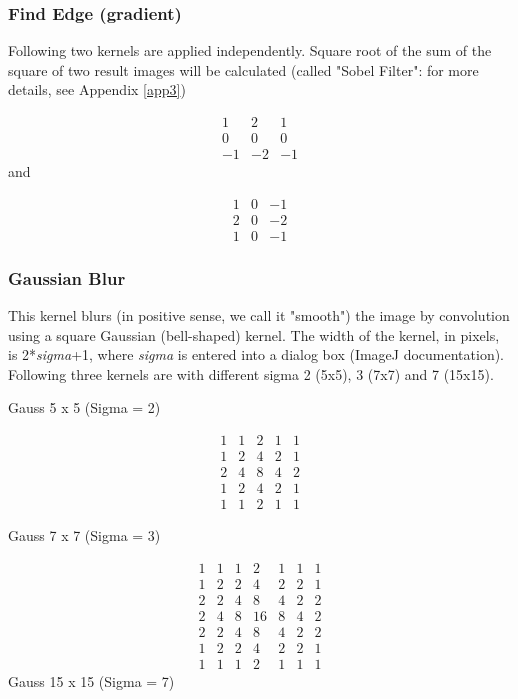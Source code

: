 \subsubsection{Find Edge (gradient)}
\label{subsub:findedgekernel}
Following two kernels are applied independently. Square root of the sum
of the square of two result images will be calculated (called
"Sobel Filter": for more details,
see Appendix \ref{app3}) \ 

\[
 \begin{matrix}
  1 & 2 & 1 \\
  0 & 0 & 0 \\
  -1 & -2 & -1
 \end{matrix}
\]
and

\[
 \begin{matrix}
  1 & 0 & -1 \\
  2 & 0 & -2 \\
  1 & 0 & -1
 \end{matrix}
\]


\subsubsection{Gaussian Blur}

This kernel blurs (in positive sense, we call it
"smooth") the image by convolution
using a square Gaussian (bell-shaped) kernel. The width of the kernel,
in pixels, is 2*\textit{sigma}+1, where \textit{sigma} is entered into
a dialog box (ImageJ documentation). Following three kernels are with
different sigma 2 (5x5), 3 (7x7) and 7 (15x15). 

Gauss 5 x 5 (Sigma = 2)
 
\[
 \begin{matrix}
  1 & 1 & 2 & 1 & 1\\
  1 & 2 & 4 & 2 & 1\\
  2 & 4 & 8 & 4 & 2\\
  1 & 2 & 4 & 2 & 1\\
  1 & 1 & 2 & 1 & 1
 \end{matrix}
\]

Gauss 7 x 7 (Sigma = 3)

\[
 \begin{matrix}
  1 & 1 & 1 & 2 & 1 & 1 & 1\\
  1 & 2 & 2 & 4 & 2 & 2 & 1\\
  2 & 2 & 4 & 8 & 4 & 2 & 2\\
  2 & 4 & 8 & 16 & 8 & 4 & 2\\
  2 & 2 & 4 & 8 & 4 & 2 & 2\\
  1 & 2 & 2 & 4 & 2 & 2 & 1\\
  1 & 1 & 1 & 2 & 1 & 1 & 1
 \end{matrix}
\]
Gauss 15 x 15 (Sigma = 7)

